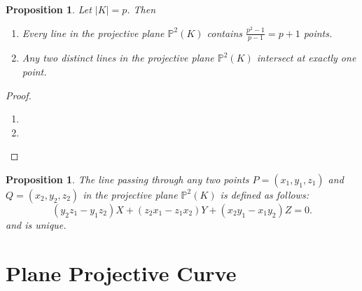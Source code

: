 \documentclass[12pt,openany]{book}
\newtheorem{proposition}[theorem]{Proposition}
\theoremstyle{definition}
\newcommand{\abs}[1]{\left\lvert #1 \right\rvert}
\begin{document}
	\begin{tcolorbox}[colback=white,colframe=procolor,arc=5pt,title={\color{white}\bf }]
		\begin{proposition}
			Let $\abs{K}=p$. Then \begin{enumerate}[(1)]
				\item Every line in the projective plane $\mathbb{P}^2(K)$ contains $\frac{p^2-1}{p-1}=p+1$ points.
				\item Any two distinct lines in the projective plane $\mathbb{P}^2(K)$ intersect at exactly one point. 
			\end{enumerate}
		\end{proposition}
	\end{tcolorbox}
	\begin{proof}
		\begin{enumerate}[(1)]
			\item 
			\item 
		\end{enumerate}
	\end{proof}
	\vspace{8pt}
	\begin{tcolorbox}[colback=white,colframe=procolor,arc=5pt,title={\color{white}\bf }]
		\begin{proposition}
			The line passing through any two points $P=(x_1,y_1,z_1)$ and $Q=(x_2,y_2,z_2)$ in the projective plane $\mathbb{P}^2(K)$ is defined as follows:
			\[
			(y_2z_1-y_1z_2)X+(z_2x_1-z_1x_2)Y+(x_2y_1-x_1y_2)Z=0.
			\] and is unique.
		\end{proposition}
	\end{tcolorbox}
	
	\newpage
	\section{Plane Projective Curve}
	
\end{document}
